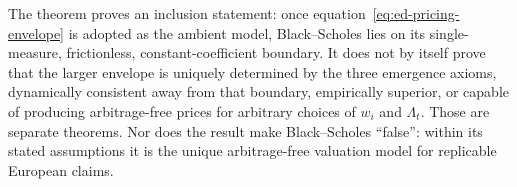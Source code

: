 \begin{remark}
\label{rem:scope-of-bs-degeneracy}
The theorem proves an inclusion statement: once
equation~\eqref{eq:ed-pricing-envelope} is adopted as the ambient model,
Black--Scholes lies on its single-measure, frictionless, constant-coefficient
boundary.  It does not by itself prove that the larger envelope is uniquely
determined by the three emergence axioms, dynamically consistent away from
that boundary, empirically superior, or capable of producing arbitrage-free
prices for arbitrary choices of $w_i$ and $\Lambda_t$.  Those are separate
theorems.  Nor does the result make Black--Scholes ``false'': within its stated
assumptions it is the unique arbitrage-free valuation model for replicable
European claims.
\end{remark}

